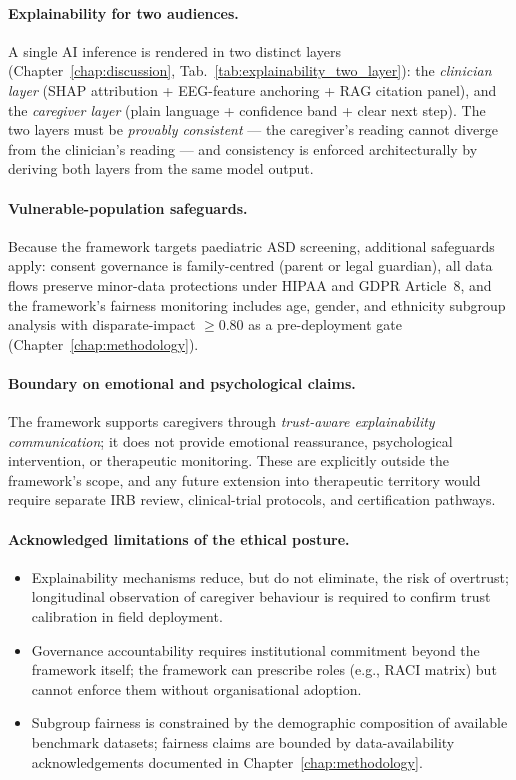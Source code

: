 \paragraph{Explainability for two audiences.} A single AI inference is rendered in two distinct layers (Chapter~\ref{chap:discussion}, Tab.~\ref{tab:explainability_two_layer}): the \emph{clinician layer} (SHAP attribution + EEG-feature anchoring + RAG citation panel), and the \emph{caregiver layer} (plain language + confidence band + clear next step). The two layers must be \emph{provably consistent} --- the caregiver's reading cannot diverge from the clinician's reading --- and consistency is enforced architecturally by deriving both layers from the same model output.

\paragraph{Vulnerable-population safeguards.} Because the framework targets paediatric ASD screening, additional safeguards apply: consent governance is family-centred (parent or legal guardian), all data flows preserve minor-data protections under HIPAA and GDPR Article~8, and the framework's fairness monitoring includes age, gender, and ethnicity subgroup analysis with disparate-impact $\geq 0.80$ as a pre-deployment gate (Chapter~\ref{chap:methodology}).

\paragraph{Boundary on emotional and psychological claims.} The framework supports caregivers through \emph{trust-aware explainability communication}; it does not provide emotional reassurance, psychological intervention, or therapeutic monitoring. These are explicitly outside the framework's scope, and any future extension into therapeutic territory would require separate IRB review, clinical-trial protocols, and certification pathways.

\paragraph{Acknowledged limitations of the ethical posture.}
\begin{itemize}[leftmargin=*, itemsep=3pt]
    \item Explainability mechanisms reduce, but do not eliminate, the risk of overtrust; longitudinal observation of caregiver behaviour is required to confirm trust calibration in field deployment.
    \item Governance accountability requires institutional commitment beyond the framework itself; the framework can prescribe roles (e.g., RACI matrix) but cannot enforce them without organisational adoption.
    \item Subgroup fairness is constrained by the demographic composition of available benchmark datasets; fairness claims are bounded by data-availability acknowledgements documented in Chapter~\ref{chap:methodology}.
\end{itemize}

